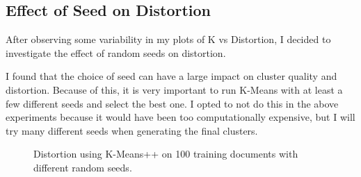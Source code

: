 \documentclass{article} %
\begin{document}
\subsection{Effect of Seed on Distortion}

After observing some variability in my plots of K vs Distortion, I decided to investigate the effect of random seeds on distortion.

I found that the choice of seed can have a large impact on cluster quality and distortion. Because of this, it is very important to run K-Means with at least a few different seeds and select the best one. I opted to not do this in the above experiments because it would have been too computationally expensive, but I will try many different seeds when generating the final clusters.

\begin{figure}[h]
\begin{center}
\end{center}
\caption{Distortion using K-Means++ on 100 training documents with different random seeds.}
\end{figure}
\end{document}
